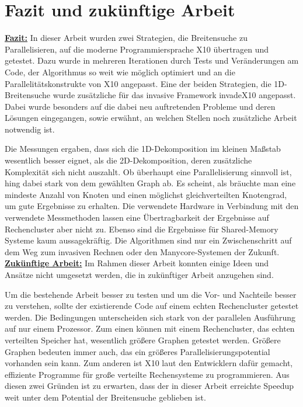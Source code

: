\chapter{Fazit und zukünftige Arbeit} %
\label{cha:fazit_und_zuk_nftige_arbeit}
\underline{\textbf{Fazit:}}
In dieser Arbeit wurden zwei Strategien, die Breitensuche zu Parallelisieren, auf die moderne Programmiersprache X10 übertragen und getestet. Dazu wurde in mehreren Iterationen durch Tests und Veränderungen am Code, der Algorithmus so weit wie möglich optimiert und an die Parallelitätskonstrukte von X10 angepasst. Eine der beiden Strategien, die 1D-Breitensuche wurde zusätzliche für das invasive Framework invadeX10 angepasst. Dabei wurde besonders auf die dabei neu auftretenden Probleme und deren Lösungen eingegangen, sowie erwähnt, an welchen Stellen noch zusätzliche Arbeit notwendig ist.

Die Messungen ergaben, dass sich die 1D-Dekomposition im kleinen Maßstab wesentlich besser eignet, als die 2D-Dekomposition, deren zusätzliche Komplexität sich nicht auszahlt. Ob überhaupt eine Parallelisierung sinnvoll ist, hing dabei stark von dem gewählten Graph ab. Es scheint, als bräuchte man eine mindeste Anzahl von Knoten und einen möglichst gleichverteilten Knotengrad, um gute Ergebnisse zu erhalten. Die verwendete Hardware in Verbindung mit den verwendete Messmethoden lassen eine Übertragbarkeit der Ergebnisse auf Rechencluster aber nicht zu. Ebenso sind die Ergebnisse für Shared-Memory Systeme kaum aussagekräftig. Die Algorithmen sind nur ein Zwischenschritt auf dem Weg zum invasiven Rechnen oder den Manycore-Systemen der Zukunft.
\newline\newline
\underline{\textbf{Zukünftige Arbeit:}}
Im Rahmen dieser Arbeit konnten einige Ideen und Ansätze nicht umgesetzt werden, die in zukünftiger Arbeit anzugehen sind.

Um die bestehende Arbeit besser zu testen und um die Vor- und Nachteile besser zu verstehen, sollte der existierende Code auf einem echten Rechencluster getestet werden. Die Bedingungen unterscheiden sich stark von der parallelen Ausführung auf nur einem Prozessor. Zum einen können mit einem Rechencluster, das echten verteilten Speicher hat, wesentlich größere Graphen getestet werden. Größere Graphen bedeuten immer auch, das ein größeres Parallelisierungspotential vorhanden sein kann. Zum anderen ist X10 laut den Entwicklern dafür gemacht, effiziente Programme für große verteilte Rechensysteme zu programmieren. Aus diesen zwei Gründen ist zu erwarten, dass der in dieser Arbeit erreichte Speedup weit unter dem Potential der Breitensuche geblieben ist. 

